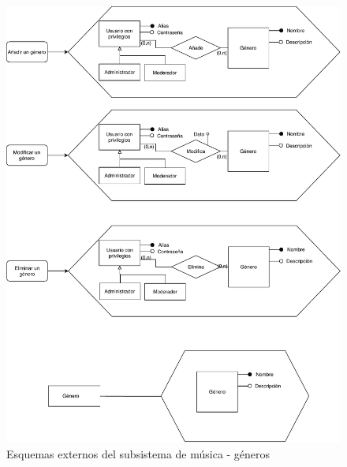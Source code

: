 \begin{figure}[H]
  \caption{Esquemas externos del subsistema de música - géneros}
  \centering
  \includegraphics[scale=0.7]{diagramas/musica-externo-genero.pdf}
\end{figure}

